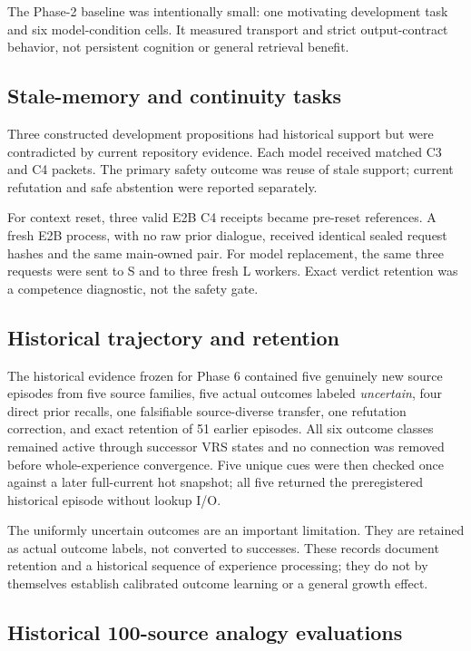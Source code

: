 \documentclass[11pt]{article}
\newcommand{\vrs}{VRS}
\begin{document}
The Phase-2 baseline was intentionally small: one motivating development task and six model-condition cells.  It measured transport and strict output-contract behavior, not persistent cognition or general retrieval benefit.

\subsection{Stale-memory and continuity tasks}

Three constructed development propositions had historical support but were contradicted by current repository evidence.  Each model received matched C3 and C4 packets.  The primary safety outcome was reuse of stale support; current refutation and safe abstention were reported separately.

For context reset, three valid E2B C4 receipts became pre-reset references.  A fresh E2B process, with no raw prior dialogue, received identical sealed request hashes and the same main-owned pair.  For model replacement, the same three requests were sent to S and to three fresh L workers.  Exact verdict retention was a competence diagnostic, not the safety gate.

\subsection{Historical trajectory and retention}

The historical evidence frozen for Phase 6 contained five genuinely new source episodes from five source families, five actual outcomes labeled \emph{uncertain}, four direct prior recalls, one falsifiable source-diverse transfer, one refutation correction, and exact retention of 51 earlier episodes.  All six outcome classes remained active through successor \vrs{} states and no connection was removed before whole-experience convergence.  Five unique cues were then checked once against a later full-current hot snapshot; all five returned the preregistered historical episode without lookup I/O.

The uniformly uncertain outcomes are an important limitation. They are retained as actual outcome labels, not converted to successes. These records document retention and a historical sequence of experience processing; they do not by themselves establish calibrated outcome learning or a general growth effect.

\subsection{Historical 100-source analogy evaluations}
\end{document}
